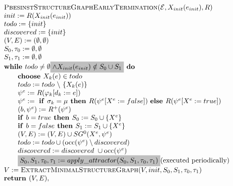 \documentclass{article}
\newcommand{\Space}{\text{\ }}
\newcommand{\If}{\text{\textbf{if }}}
\newcommand{\Do}{\text{\textbf{ do }}}
\newcommand{\Then}{\text{\textbf{ then }}}
\newcommand{\Else}{\text{\textbf{else }}}
\newcommand{\For}{\text{\textbf{for }}}
\newcommand{\While}{\text{\textbf{while }}}
\newcommand{\Choose}{\text{\textbf{choose }}}
\newcommand{\Return}{\text{\textbf{return }}}
\begin{document}
\begin{equation*}
\begin{array}{l}
\textsc{PbesinstStructureGraphEarlyTermination}(\mathcal{E}, X_{init}(e_{init}), R) \\ 
init:=R(X_{init}(e_{init})) \\
todo:=\{init\} \\
discovered:=\{init\} \\
(V,E) :=(\emptyset ,\emptyset ) \\ 
S_0, \tau_0 := \emptyset, \emptyset \\
S_1, \tau_1 := \emptyset, \emptyset \\
\While todo\neq \emptyset
\colorbox{lightgray}{$\wedge X_{init}(e_{init}) \notin S_0 \cup S_1 $}
\Do \\ 
\qquad \Choose X_{k}(e)\in todo \\ 
\qquad todo:=todo\ \backslash \ \{X_{k}(e)\} \\ 
\qquad \psi ^{e}:=R(\varphi _{k}[d_{k}:=e]) \\ 
\qquad \psi^e := \Space \If \sigma_k = \mu \Then R(\psi^e[X^e := false])
\Space \Else R(\psi^e[X^e := true]) \\
\qquad (b,\psi^e) := R^+(\psi^e) \\
\qquad \If b = true \Then S_0 := S_0 \cup \{ X^e \}\\
\qquad \If b = false \Then S_1 := S_1 \cup \{ X^e \}\\
\qquad (V,E) := (V,E) \cup SG^{0}(X^{e},\psi ^{e}) \\ 
\qquad todo:=todo\cup (\mathrm{occ}(\psi ^{e})\setminus discovered) \\
\qquad discovered:=discovered\ \cup \mathrm{occ}(\psi ^{e}) \\
\qquad \colorbox{lightgray}{$S_0, S_1, \tau_0, \tau_1 := apply\_attractor(S_0, S_1, \tau_0, \tau_1)$}  \text{(executed periodically)} \\
V := \textsc{ExtractMinimalStructureGraph}(V, init, S_0, S_1, \tau_0, \tau_1) \\
\Return(V, E),
\end{array}
\end{equation*}
\end{document}
